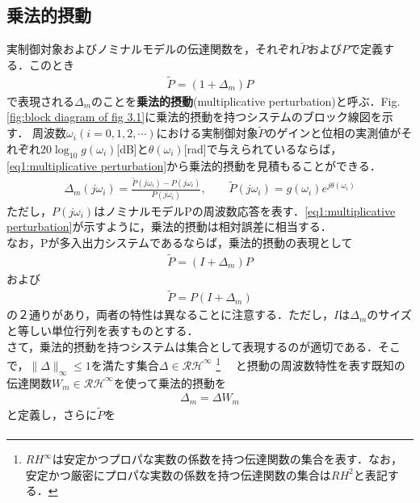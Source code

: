 \documentclass[a4paper,11pt,uplatex]{jsarticle} %
\theoremstyle{definition}	%
\newcommand{\figref}[1]{Fig. \ref{#1}}
\begin{document}
\subsection{乗法的摂動}
実制御対象およびノミナルモデルの伝達関数を，それぞれ$\tilde{P}$および$P$で定義する．このとき{
\begin{align}
\label{multiplicative perturbation}
\tilde{P} = ( 1 + \Delta_m) P
\end{align}
で表現される$\Delta_m$のことを\textbf{乗法的摂動}(multiplicative perturbation)と呼ぶ．\figref{fig:block diagram of fig 3.1}に乗法的摂動を持つシステムのブロック線図を示す．
周波数$\omega_i(i = 0,1,2,\cdots)$における実制御対象$\tilde{P}$のゲインと位相の実測値がそれぞれ$20 \log_{10}{g (\omega_i)}$[dB]と$\theta(\omega_i)$[rad]で与えられているならば，\eqref{eq1:multiplicative perturbation}から乗法的摂動を見積もることができる．
\begin{align}
\label{eq1:multiplicative perturbation}
\Delta_m(j \omega_i) = \frac{ \tilde{P}(j \omega_i) - P(j \omega_i)} {P(j\omega_i)}, \qquad \tilde{P}(j\omega_i) = g(\omega_i)e^{j\theta(\omega_i)}
\end{align}
ただし，$P(j\omega_i)$はノミナルモデルPの周波数応答を表す．\eqref{eq1:multiplicative perturbation}が示すように，乗法的摂動は相対誤差に相当する．\\
なお，Pが多入出力システムであるならば，乗法的摂動の表現として
\begin{align}
\label{eq2:multiplicative perturbation}
\tilde{P} = (I + \Delta_m) P
\end{align}
および
\begin{align}
\label{eq3:multiplicative perturbation}
\tilde{P} = P(I + \Delta_m)
\end{align}
の２通りがあり，両者の特性は異なることに注意する．ただし，$I$は$\Delta_m$のサイズと等しい単位行列を表すものとする．\\
さて，乗法的摂動を持つシステムは集合として表現するのが適切である．そこで，$\| \Delta \|_\infty \leq 1 $を満たす集合$\Delta \in \mathcal{RH}^\infty $
\footnote{$RH^\infty$は安定かつプロパな実数の係数を持つ伝達関数の集合を表す．なお，安定かつ厳密にプロパな実数の係数を持つ伝達関数の集合は$RH^2$と表記する．}　%
と摂動の周波数特性を表す既知の伝達関数$W_m \in \mathcal{RH}^\infty$を使って乗法的摂動を
\begin{align}
\label{eq4:multiplicative perturbation}
\Delta_m = \Delta W_m
\end{align}
と定義し，さらに$\tilde{P}$を
\begin{align}
\label{eq5:multiplicative perturbation}

\end{align}}
\end{document}
